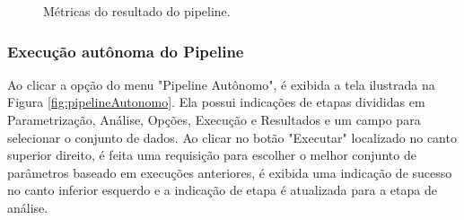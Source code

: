 \documentclass[portugues]{ic-tese}
\begin{document}
\begin{figure}[H]
    \centering
    \caption{Métricas do resultado do pipeline.}
    \label{fig:pipelineManualMetricas}
\end{figure}

\subsubsection{Execução autônoma do Pipeline}

Ao clicar a opção do menu "Pipeline Autônomo", é exibida a tela ilustrada na Figura \ref{fig:pipelineAutonomo}. Ela possui indicações de etapas divididas em Parametrização, Análise, Opções, Execução e Resultados e um campo para selecionar o conjunto de dados. Ao clicar no botão "Executar" localizado no canto superior direito, é feita uma requisição para escolher o melhor conjunto de parâmetros baseado em execuções anteriores, é exibida uma indicação de sucesso no canto inferior esquerdo e a indicação de etapa é atualizada para a etapa de análise.
\end{document}

